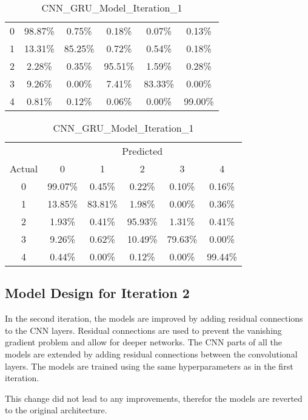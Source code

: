 \begin{table}[ht]
\begin{minipage}{0.32\textwidth}
\begin{tabular}{cccccc}
            \midrule
            0 & 98.87\% & 0.75\% & 0.18\% & 0.07\% & 0.13\% \\
            1 & 13.31\% & 85.25\% & 0.72\% & 0.54\% & 0.18\% \\
            2 & 2.28\%  & 0.35\% & 95.51\% & 1.59\% & 0.28\% \\
            3 & 9.26\%  & 0.00\% & 7.41\%  & 83.33\% & 0.00\% \\
            4 & 0.81\%  & 0.12\% & 0.06\%  & 0.00\% & 99.00\% \\
            \bottomrule
        \end{tabular}
    \end{minipage}
    \hfill
    \begin{minipage}{0.32\textwidth}
        \centering
        \caption*{CNN\_GRU\_Model\_Iteration\_1}
        \begin{tabular}{cccccc}
            \toprule
            & \multicolumn{5}{c}{Predicted} \\
            \cmidrule(lr){2-6}
            Actual & 0 & 1 & 2 & 3 & 4 \\
            \midrule
            0 & 99.07\% & 0.45\% & 0.22\% & 0.10\% & 0.16\% \\
            1 & 13.85\% & 83.81\% & 1.98\% & 0.00\% & 0.36\% \\
            2 & 1.93\%  & 0.41\% & 95.93\% & 1.31\% & 0.41\% \\
            3 & 9.26\%  & 0.62\% & 10.49\% & 79.63\% & 0.00\% \\
            4 & 0.44\%  & 0.00\% & 0.12\% & 0.00\% & 99.44\% \\
            \bottomrule
        \end{tabular}
    \end{minipage}
\end{table}

\subsection{Model Design for Iteration 2}
In the second iteration, the models are improved by adding residual connections to the CNN layers. Residual connections are used to prevent the vanishing gradient problem and allow for deeper networks. The CNN parts of all the models are extended by adding residual connections between the convolutional layers. The models are trained using the same hyperparameters as in the first iteration.

This change did not lead to any improvements, therefor the models are reverted to the original architecture. 

